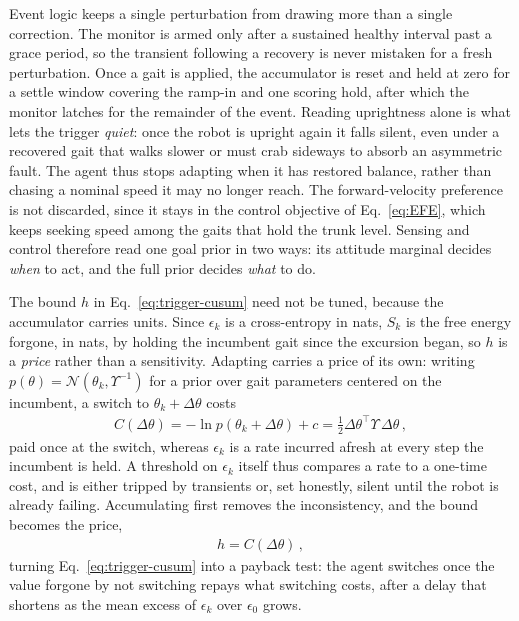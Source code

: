 \documentclass[lettersize,journal]{IEEEtran}
\newcommand{\cN}{\mathcal{N}}
\begin{document}
Event logic keeps a single perturbation from drawing more than a single correction.
The monitor is armed only after a sustained healthy interval past a grace period, so the transient following a recovery is never mistaken for a fresh perturbation.
Once a gait is applied, the accumulator is reset and held at zero for a settle window covering the ramp-in and one scoring hold, after which the monitor latches for the remainder of the event.
Reading uprightness alone is what lets the trigger \emph{quiet}: once the robot is upright again it falls silent, even under a recovered gait that walks slower or must crab sideways to absorb an asymmetric fault.
The agent thus stops adapting when it has restored balance, rather than chasing a nominal speed it may no longer reach.
The forward-velocity preference is not discarded, since it stays in the control objective of Eq.~\ref{eq:EFE}, which keeps seeking speed among the gaits that hold the trunk level.
Sensing and control therefore read one goal prior in two ways: its attitude marginal decides \emph{when} to act, and the full prior decides \emph{what} to do.


The bound $h$ in Eq.~\ref{eq:trigger-cusum} need not be tuned, because the accumulator carries units.
Since $\epsilon_k$ is a cross-entropy in nats, $S_k$ is the free energy forgone, in nats, by holding the incumbent gait since the excursion began, so $h$ is a \emph{price} rather than a sensitivity.
Adapting carries a price of its own: writing $p(\theta) = \cN(\theta_k, \Upsilon^{-1})$ for a prior over gait parameters centered on the incumbent, a switch to $\theta_k + \Delta\theta$ costs
\begin{align} \label{eq:switch-cost}
    C(\Delta\theta) = -\ln p(\theta_k + \Delta\theta) + c = \tfrac{1}{2}\Delta\theta^{\top}\Upsilon\,\Delta\theta \,,
\end{align}
paid once at the switch, whereas $\epsilon_k$ is a rate incurred afresh at every step the incumbent is held.
A threshold on $\epsilon_k$ itself thus compares a rate to a one-time cost, and is either tripped by transients or, set honestly, silent until the robot is already failing.
Accumulating first removes the inconsistency, and the bound becomes the price,
\begin{align} \label{eq:threshold}
    h = C(\Delta\theta) \,,
\end{align}
turning Eq.~\ref{eq:trigger-cusum} into a payback test: the agent switches once the value forgone by not switching repays what switching costs, after a delay that shortens as the mean excess of $\epsilon_k$ over $\epsilon_0$ grows.
\end{document}
